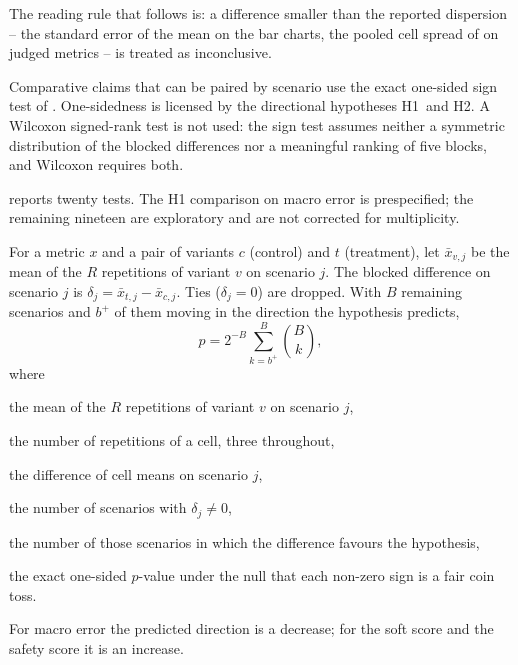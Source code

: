The reading rule that follows is: a difference smaller than the reported dispersion -- the standard error of the mean on the bar charts, the pooled cell spread of  on judged metrics -- is treated as inconclusive.

Comparative claims that can be paired by scenario use the exact one-sided sign test of . One-sidedness is licensed by the directional hypotheses H1~and H2. A Wilcoxon signed-rank test is not used: the sign test assumes neither a symmetric distribution of the blocked differences nor a meaningful ranking of five blocks, and Wilcoxon requires both.

 reports twenty tests. The H1 comparison on macro error is prespecified; the remaining nineteen are exploratory and are not corrected for multiplicity.

\begin{definition}
    \label{def:paired-sign-test}
    For a metric $x$ and a pair of variants $c$ (control) and $t$ (treatment), let $\bar{x}_{v,j}$ be the mean of the $R$ repetitions of variant $v$ on scenario $j$. The blocked difference on scenario $j$ is $\delta_j = \bar{x}_{t,j} - \bar{x}_{c,j}$. Ties ($\delta_j = 0$) are dropped. With $B$ remaining scenarios and $b^{+}$ of them moving in the direction the hypothesis predicts,
    \[
        p = 2^{-B} \sum_{k=b^{+}}^{B} \binom{B}{k},
    \]
    where
    \begin{eqwhere}[2.0cm]
        \item[\(\bar{x}_{v,j}\)] the mean of the $R$ repetitions of variant $v$ on scenario $j$,
        \item[\(R\)] the number of repetitions of a cell, three throughout,
        \item[\(\delta_j\)] the difference of cell means on scenario $j$,
        \item[\(B\)] the number of scenarios with $\delta_j \neq 0$,
        \item[\(b^{+}\)] the number of those scenarios in which the difference favours the hypothesis,
        \item[\(p\)] the exact one-sided $p$-value under the null that each non-zero sign is a fair coin toss.
    \end{eqwhere}
    For macro error the predicted direction is a decrease; for the soft score and the safety score it is an increase.
\end{definition}
